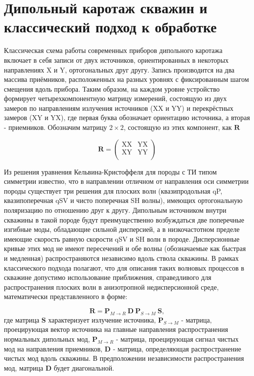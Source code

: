 \documentclass[a4paper,11pt]{article}
\begin{document}
\section{Дипольный каротаж скважин и классический подход к обработке}
Классическая схема работы современных приборов дипольного каротажа включает в себя записи от двух источников, ориентированных в некоторых направлениях X и Y, ортогональных друг другу. Запись производится на два массива приёмников, расположенных на разных уровнях с фиксированным шагом смещения вдоль прибора. Таким образом, на каждом уровне устройство формирует четырехкомпонентную матрицу измерений, состоящую из двух замеров по направлениям излучения источников (XX и YY) и перекрёстных замеров (XY и YX), где первая буква обозначает ориентацию источника, а вторая - приемников. Обозначим матрицу $2 \times 2$, состоящую из этих компонент, как $\mathbf{R}$ 

$$
	\mathbf{R} = \left(
	\begin{array}{cc}
	\text{XX} & \text{YX} \\
	\text{XY} & \text{YY} \\
	\end{array}
	\right) 
$$

Из решения уравнения Кельвина-Кристоффеля для породы с ТИ типом симметрии известно, что в направлении отличном от направления оси симметрии породы существует три решения для плоских волн (квазипродольная qP, квазипоперечная qSV и чисто поперечная SH волны), имеющих ортогональную поляризацию по отношению друг к другу. Дипольным источником внутри скважины в такой породе будут преимущественно возбуждаться две поперечные изгибные моды, обладающие сильной дисперсией, а в низкочастотном пределе имеющие скорость равную скорости qSV и SH волн в породе. Дисперсионные кривые этих мод не имеют пересечений и обе волны (обозначаемые как быстрая и медленная) распространяются независимо вдоль ствола скважины. В рамках классического подхода полагают, что для описания таких волновых процессов в скважине допустимо использование приближения, справедливого для распространения плоских волн в анизотропной недисперсионной среде, математически представленного в форме:

$$
	\mathbf{R} = \mathbf{P}_{M \rightarrow R} \ \mathbf{D} \ \mathbf{P}_{S \rightarrow M} \ \mathbf{S},
$$
где матрица $\mathbf{S}$ характеризует излучение источника, $\mathbf{P}_{S \rightarrow M}$ - матрица, проецирующая вектор источника на главные направления распространения нормальных дипольных мод, $\mathbf{P}_{M \rightarrow R}$ - матрица, проецирующая сигнал чистых мод на направления приемников, $\mathbf{D}$ - матрица, определяющая распространение чистых мод вдоль скважины. В предположении независимости распространения мод, матрица $\mathbf{D}$ будет диагональной. 
\end{document}
